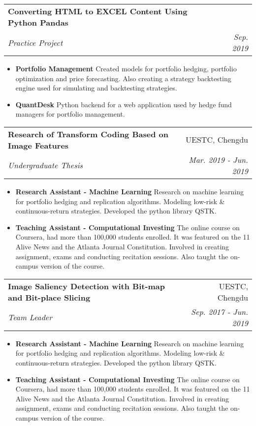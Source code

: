 \documentclass[9pt, a4paper]{article}
\makeatletter
\newcommand{\resumeItem}[2]{
  \item\small{
    \textbf{#1}{ #2 \vspace{-2pt}}
  }
}
\newcommand{\resumeSubheading}[4]{
  \vspace{-1pt}\item
    \begin{tabular*}{0.97\textwidth}{l@{\extracolsep{\fill}}r}
      \textbf{#1} & #2 \\
      \textit{\small#3} & \textit{\small #4} \\
    \end{tabular*}\vspace{-5pt}
}
\newcommand{\resumeItemListStart}{\begin{itemize}}
\newcommand{\resumeItemListEnd}{\end{itemize}\vspace{-5pt}}
\makeatother
\begin{document}
    \resumeSubheading
      {Converting HTML to EXCEL Content Using Python Pandas}{}
      {Practice Project}{Sep. 2019}
      \resumeItemListStart
        \resumeItem{Portfolio Management}
          {Created models for portfolio hedging,  portfolio optimization and price forecasting. Also creating a strategy backtesting engine used for simulating and backtesting strategies.}
        \resumeItem{QuantDesk}
          {Python backend for a web application used by hedge fund managers for portfolio management.}
      \resumeItemListEnd

    \resumeSubheading
      {Research of Transform Coding Based on Image Features}{UESTC, Chengdu}
      {Undergraduate Thesis}{Mar. 2019 - Jun. 2019}
      \resumeItemListStart
        \resumeItem{Research Assistant - Machine Learning}
          {Research on machine learning for portfolio hedging and replication algorithms. Modeling low-risk \& continuous-return strategies. Developed the python library QSTK.}
        \resumeItem{Teaching Assistant - Computational Investing}
          {The online course on Coursera, had more than 100,000 students enrolled. It was featured on the 11 Alive News and the Atlanta Journal Constitution. Involved in creating assignment, exams and conducting recitation sessions. Also taught the on-campus version of the course.}
      \resumeItemListEnd

    \resumeSubheading
    {Image Saliency Detection with Bit-map and Bit-place Slicing}{UESTC, Chengdu}
    {Team Leader}{Sep. 2017 - Jun. 2019}
    \resumeItemListStart
      \resumeItem{Research Assistant - Machine Learning}
        {Research on machine learning for portfolio hedging and replication algorithms. Modeling low-risk \& continuous-return strategies. Developed the python library QSTK.}
      \resumeItem{Teaching Assistant - Computational Investing}
        {The online course on Coursera, had more than 100,000 students enrolled. It was featured on the 11 Alive News and the Atlanta Journal Constitution. Involved in creating assignment, exams and conducting recitation sessions. Also taught the on-campus version of the course.}
    \resumeItemListEnd

\end{document}
